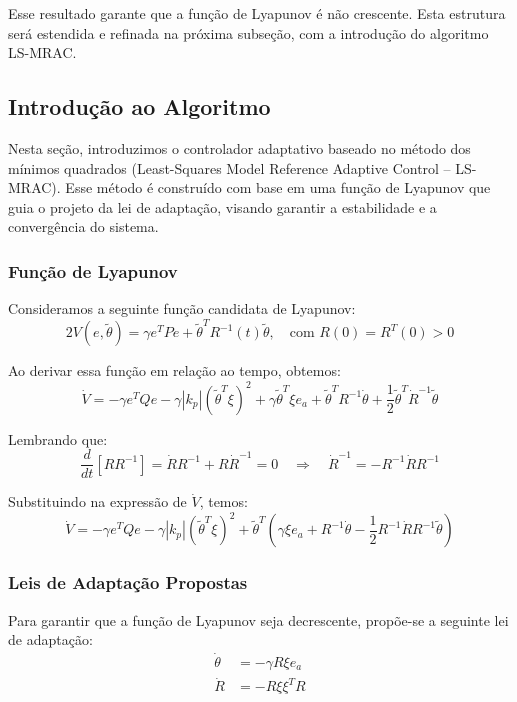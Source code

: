 \documentclass[10pt]{article}
\begin{document}
Esse resultado garante que a função de Lyapunov é não crescente. Esta estrutura será estendida e refinada na próxima subseção, com a introdução do algoritmo LS-MRAC.


\subsection{Introdução ao Algoritmo}

Nesta seção, introduzimos o controlador adaptativo baseado no método dos mínimos quadrados (Least-Squares Model Reference Adaptive Control – LS-MRAC). Esse método é construído com base em uma função de Lyapunov que guia o projeto da lei de adaptação, visando garantir a estabilidade e a convergência do sistema.

\subsubsection{Função de Lyapunov}

Consideramos a seguinte função candidata de Lyapunov:
\[
2V(e, \tilde{\theta}) = \gamma e^T P e + \tilde{\theta}^T R^{-1}(t) \tilde{\theta}, \quad \text{com } R(0) = R^T(0) > 0
\]

Ao derivar essa função em relação ao tempo, obtemos:
\[
\dot{V} = -\gamma e^T Q e - \gamma |k_p| (\tilde{\theta}^T \xi)^2 + \gamma \tilde{\theta}^T \xi e_a + \tilde{\theta}^T R^{-1} \dot{\theta} + \frac{1}{2} \tilde{\theta}^T \dot{R}^{-1} \tilde{\theta}
\]

Lembrando que:
\[
\frac{d}{dt}[R R^{-1}] = \dot{R} R^{-1} + R \dot{R}^{-1} = 0 \quad \Rightarrow \quad \dot{R}^{-1} = -R^{-1} \dot{R} R^{-1}
\]

Substituindo na expressão de $\dot{V}$, temos:
\[
\dot{V} = -\gamma e^T Q e - \gamma |k_p| (\tilde{\theta}^T \xi)^2 + \tilde{\theta}^T \left( \gamma \xi e_a + R^{-1} \dot{\theta} - \frac{1}{2} R^{-1} \dot{R} R^{-1} \tilde{\theta} \right)
\]

\subsubsection{Leis de Adaptação Propostas}

Para garantir que a função de Lyapunov seja decrescente, propõe-se a seguinte lei de adaptação:
\begin{align*}
\dot{\theta} &= -\gamma R \xi e_a \\
\dot{R} &= -R \xi \xi^T R
\end{align*}
\end{document}
